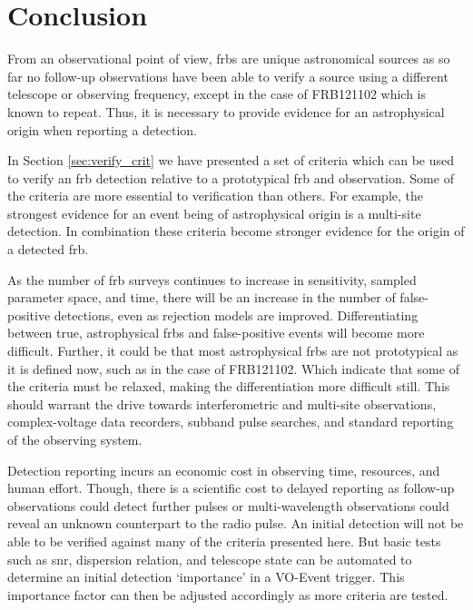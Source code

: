 \documentclass[a4paper,fleqn,usenatbib]{mnras}
\begin{document}
\section{Conclusion}


From an observational point of view, \glspl{frb} are unique astronomical sources
as so far no follow-up observations have been able to verify a source using a
different telescope or observing frequency, except in the case of FRB121102
which is known to repeat. Thus, it is necessary to provide evidence for an
astrophysical origin when reporting a detection.

In Section \ref{sec:verify_crit} we have presented a set of criteria which can
be used to verify an \gls{frb} detection relative to a prototypical \gls{frb}
and observation. Some of the criteria are more essential to verification than
others.  For example, the strongest evidence for an event being of astrophysical
origin is a multi-site detection.  In combination these criteria become stronger
evidence for the origin of a detected \gls{frb}.

As the number of \gls{frb} surveys continues to increase in sensitivity, sampled
parameter space, and time, there will be an increase in the number of
false-positive detections, even as rejection models are improved.
Differentiating between true, astrophysical \glspl{frb} and false-positive
events will become more difficult.  Further, it could be that most astrophysical
\glspl{frb} are not prototypical as it is defined now, such as in the case of
FRB121102. Which indicate that some of the criteria must be relaxed,
making the differentiation more difficult still.  This should warrant the drive
towards interferometric and multi-site observations, complex-voltage data
recorders, subband pulse searches, and standard reporting of the observing
system.

Detection reporting incurs an economic cost in observing time, resources, and
human effort. Though, there is a scientific cost to delayed reporting as
follow-up observations could detect further pulses or multi-wavelength
observations could reveal an unknown counterpart to the radio pulse. An initial
detection will not be able to be verified against many of the criteria presented
here. But basic tests such as \gls{snr}, dispersion relation, and telescope
state can be automated to determine an initial detection `importance' in a
VO-Event trigger. This importance factor can then be adjusted accordingly as
more criteria are tested.
\end{document}
